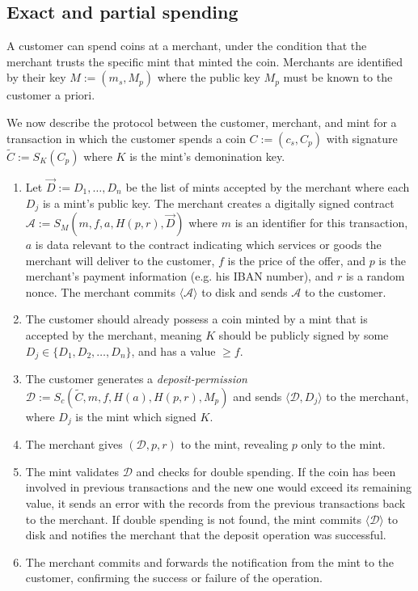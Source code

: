 \documentclass{llncs}
\begin{document}
\subsection{Exact and partial spending}

A customer can spend coins at a merchant, under the condition that the
merchant trusts the specific mint that minted the coin.  Merchants are
identified by their key $M := (m_s, M_p)$ where the public key $M_p$
must be known to the customer a priori.

We now describe the protocol between the customer, merchant, and mint
for a transaction in which the customer spends a coin $C := (c_s, C_p)$
with signature $\widetilde{C} := S_K(C_p)$
 where $K$ is the mint's demonination key.

\begin{enumerate}
\item\label{contract}
  Let $\vec{D} := D_1, \ldots, D_n$ be the list of mints accepted by
  the merchant where each $D_j$ is a mint's public key.  
  The merchant creates a digitally signed contract
    $\mathcal{A} := S_M(m, f, a, H(p, r), \vec{D})$
  where $m$ is an identifier for this transaction, $a$ is data relevant
  to the contract indicating which services or goods the merchant will
  deliver to the customer, $f$ is the price of the offer, and
  $p$ is the merchant's payment information (e.g. his IBAN number), and
  $r$ is a random nonce.  The merchant commits $\langle \mathcal{A} \rangle$
  to disk and sends $\mathcal{A}$ to the customer.
\item\label{deposit} 
  The customer should already possess a coin minted by a mint that is
  accepted by the merchant, meaning $K$ should be publicly signed by
  some $D_j \in \{D_1, D_2, \ldots, D_n\}$, and has a value $\geq f$. 
\item  The customer generates a \emph{deposit-permission} $\mathcal{D} :=
  S_c(\widetilde{C}, m, f, H(a), H(p,r), M_p)$
  and sends $\langle \mathcal{D}, D_j\rangle$ to the merchant,
  where $D_j$ is the mint which signed $K$.
\item The merchant gives $(\mathcal{D}, p, r)$ to the mint, revealing $p$
  only to the mint.
\item The mint validates $\mathcal{D}$ and checks for double spending.
  If the coin has been involved in previous transactions and the new
  one would exceed its remaining value, it sends an error
  with the records from the previous transactions back to the merchant.
%
  If double spending is not found, the mint commits $\langle \mathcal{D} \rangle$ to disk
  and notifies the merchant that the deposit operation was successful.
\item The merchant commits and forwards the notification from the mint to the
  customer, confirming the success or failure of the operation.
\end{enumerate}
\end{document}

